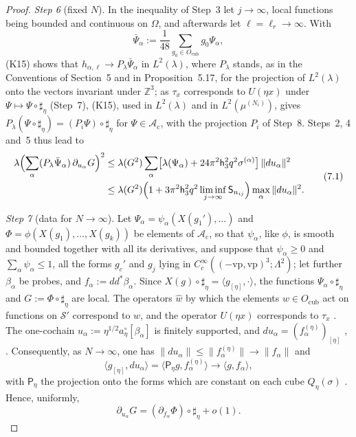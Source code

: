 \documentclass[11pt,letterpaper,reqno]{amsart}
\theoremstyle{definition}
\begin{document}
\begin{proof}
\emph{Step 6} (fixed $N$).
In the inequality of Step~3 let $j\to\infty$, local functions being bounded and continuous on $\Omega$, and afterwards let $\ell=\ell_r\to\infty$.
With
\begin{equation*}
\bar\Psi_\alpha:=\frac1{48}\sum_{g_0\in O_{\mathrm{cub}}}g_0\Psi_\alpha,
\end{equation*}
(K15) shows that $h_{\alpha,\ell}\to P_\lambda\bar\Psi_\alpha$ in $L^2(\lambda)$, where $P_\lambda$ stands, as in the Conventions of Section~5 and in Proposition~5.17, for the projection of $L^2(\lambda)$ onto the vectors invariant under $\mathbb Z^3$;
as $\tau_x$ corresponds to $U(\eta x)$ under $\Psi\mapsto\Psi\circ\sharp_\eta$ (Step~7), (K15), used in $L^2(\lambda)$ and in $L^2(\mu^{(N_i)})$, gives $P_\lambda(\Psi\circ\sharp_\eta)=(P_i\Psi)\circ\sharp_\eta$ for $\Psi\in\mathcal A_{\mathrm c}$, with the projection $P_i$ of Step~8.
Steps~2, 4 and~5 thus lead to
\begin{equation}
\begin{split}
\lambda\Bigl(\sum_\alpha(P_\lambda\bar\Psi_\alpha)\,\partial_{u_\alpha}G\Bigr)^2
&\le\lambda(G^2)\sum_\alpha\bigl[\lambda(\Psi_\alpha)+24\pi^2\mathsf h_3^2q^2\sigma^{(\alpha)}\bigr]\,\|du_\alpha\|^2\\
&\le\lambda(G^2)\Bigl(1+3\pi^2\mathsf h_3^2q^2\liminf_{j\to\infty}\mathsf S_{n_{ij}}\Bigr)\max_\alpha\|du_\alpha\|^2.
\end{split}
\tag{7.1}\label{eq:weighted-lattice}
\end{equation}

\emph{Step 7} (data for $N\to\infty$).
Let $\Psi_\alpha=\psi_\alpha(X(g_1'),\dots)$ and $\Phi=\phi(X(g_1),\dots,X(g_k))$ be elements of $\mathcal A_{\mathrm c}$, so that $\psi_\alpha$, like $\phi$, is smooth and bounded together with all its derivatives, and suppose that $\psi_\alpha\ge0$ and $\sum_\alpha\psi_\alpha\le1$,
all the forms $g_c'$ and $g_j$ lying in $C_c^\infty((-\mathrm{vp},\mathrm{vp})^3;\Lambda^2)$;
let further $\beta_\alpha$ be probes, and $f_\alpha:=dd^*\beta_\alpha$.
Since $X(g)\circ\sharp_\eta=\langle g_{[\eta]},\cdot\rangle$, the functions $\Psi_\alpha\circ\sharp_\eta$ and $G:=\Phi\circ\sharp_\eta$ are local.
The operators $\hat w$ by which the elements $w\in O_{\mathrm{cub}}$ act on functions on $\mathcal S'$ correspond to $w$, and the operator $U(\eta x)$ corresponds to $\tau_x$ \cite[Lemma~12.6\,(a)]{QEDII}.
The one-cochain $u_\alpha:=\eta^{1/2}a^\circ_\eta[\beta_\alpha]$ is finitely supported, and $du_\alpha=(f_\alpha^{(\eta)})_{[\eta]}$ \cite[Proposition~47.1\,(b1), (b2$^\circ$)]{QEDIII}, \cite[Lemma~12.5\,(b)]{QEDII}.
Consequently, as $N\to\infty$, one has $\|du_\alpha\|\le\|f_\alpha^{(\eta)}\|\to\|f_\alpha\|$ and
\begin{equation*}
\langle g_{[\eta]},du_\alpha\rangle=\langle\mathsf P_\eta g,f_\alpha^{(\eta)}\rangle\to\langle g,f_\alpha\rangle,
\end{equation*}
with $\mathsf P_\eta$ the projection onto the forms which are constant on each cube $Q_\eta(\sigma)$ \cite[Proposition~47.1\,(b3)]{QEDIII}.
Hence, uniformly,
\begin{equation*}
\partial_{u_\alpha}G=(\partial_{f_\alpha}\Phi)\circ\sharp_\eta+o(1).
\end{equation*}


\end{proof}
\end{document}
